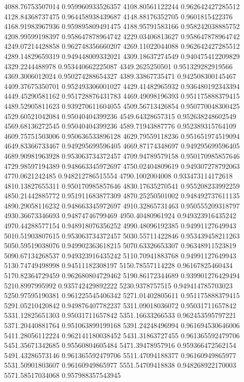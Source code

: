 {4088.76753507014 0.959960933526357
4108.80561122244 0.962642427285512
4128.84368737475 0.964458938439687
4148.88176352705 0.9601815422376
4168.91983967936 0.959895809491475
4188.95791583166 0.958242038885752
4208.99599198397 0.958647878964742
4229.03406813627 0.958647878964742
4249.07214428858 0.962748356660207
4269.11022044088 0.962642427285512
4289.14829659319 0.949448009332021
4309.18637274549 0.940475412209829
4329.2244488978 0.953440662225087
4349.2625250501 0.951329282919566
4369.3006012024 0.950274288654327
4389.33867735471 0.942508300145467
4409.37675350701 0.952493306001027
4429.41482965932 0.936480192343394
4449.45290581162 0.951728876431783
4469.49098196393 0.951175888379415
4489.52905811623 0.939270611604055
4509.56713426854 0.950770048300425
4529.60521042084 0.95040404399236
4549.64328657315 0.952638248602549
4569.68136272545 0.95040404399236
4589.71943887776 0.952389315764109
4609.75751503006 0.950636533896128
4629.79559118236 0.951651974519094
4649.83366733467 0.949295699596405
4669.87174348697 0.949295699596405
4689.90981963928 0.953063734372457
4709.94789579158 0.950170985857646
4729.98597194389 0.948663345972697
4750.02404809619 0.949307278792063
4770.0621242485 0.948212786515554
4790.1002004008 0.933473114172618
4810.13827655311 0.950170985857646
4830.17635270541 0.955208233992259
4850.21442885772 0.951911683877309
4870.25250501002 0.948492737611135
4890.29058116232 0.948663345972697
4910.32865731463 0.950555209318797
4930.36673346693 0.94874746799469
4950.40480961924 0.949323916435242
4970.44288577154 0.948918076356252
4990.48096192385 0.94991127649943
5010.51903807615 0.953063734372457
5030.55711422846 0.953439458211263
5050.59519038076 0.949902363618215
5070.63326653307 0.96348911523819
5090.67134268537 0.949323916435242
5110.70941883768 0.94991127649943
5130.74749498998 0.94511182308197
5150.78557114228 0.96167825460434
5170.82364729459 0.962680804729462
5190.86172344689 0.939901276429494
5210.8997995992 0.935742429892222
5230.9378757515 0.949414785703023
5250.97595190381 0.961225545406342
5271.01402805611 0.951175888379415
5291.05210420842 0.949876407782237
5311.09018036072 0.95031711657842
5331.12825651303 0.95031711657842
5351.16633266533 0.962453595797221
5371.20440881764 0.951063899199168
5391.24248496994 0.961694530646006
5411.28056112224 0.962141180038452
5431.31863727455 0.961365592479706
5451.35671342685 0.95560804605484
5471.39478957916 0.959366472562154
5491.43286573146 0.961365592479706
5511.47094188377 0.96160949865977
5531.50901803607 0.96160949865977
5551.54709418838 0.948268922170003
5571.58517034068 0.957988357543945
}
